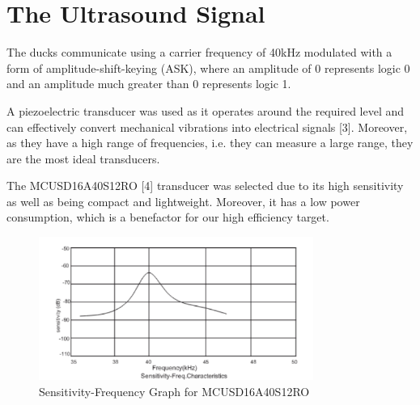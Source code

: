 \section{The Ultrasound Signal}
The ducks communicate using a carrier frequency of 40kHz modulated with a form of amplitude-shift-keying (ASK), where an amplitude of 0 represents logic 0 and an amplitude much greater than 0 represents logic 1.

A piezoelectric transducer was used as it operates around the required level and can effectively convert mechanical vibrations into electrical signals [3]. Moreover, as they have a high range of frequencies, i.e. they can measure a large range, they are the most ideal transducers.

The MCUSD16A40S12RO [4] transducer was selected due to its high sensitivity as well as being compact and lightweight. Moreover, it has a low power consumption, which is a benefactor for our high efficiency target.
\begin{figure}[h]
    \centering
    \includegraphics[width=0.8\textwidth]{subpages/images/ultra_sensitive_freq.png}
    \caption{Sensitivity-Frequency Graph for MCUSD16A40S12RO}
    \label{fig:sensitivity_frequency}
\end{figure}

